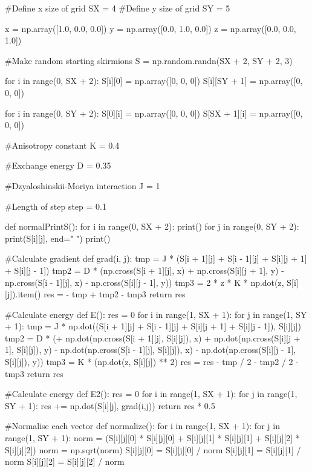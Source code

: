 \documentclass[ 12pt,x11names]{article}
\begin{document}
  \begin{python}
#Define  x size of grid
SX = 4
#Define y size of grid
SY = 5

x = np.array([1.0, 0.0, 0.0])
y = np.array([0.0, 1.0, 0.0])
z = np.array([0.0, 0.0, 1.0])

#Make random starting skirmions
S = np.random.randn(SX + 2, SY + 2, 3)

for i in range(0, SX + 2):
    S[i][0] = np.array([0, 0, 0])
    S[i][SY + 1] = np.array([0, 0, 0])

for i in range(0, SY + 2):
    S[0][i] = np.array([0, 0, 0])
    S[SX + 1][i] = np.array([0, 0, 0])

#Anisotropy constant
K = 0.4

#Exchange energy
D = 0.35

#Dzyaloshinskii-Moriya interaction
J = 1

#Length of step
step = 0.1

def normalPrintS():
    for i in range(0, SX + 2):
        print()
        for j in range(0, SY + 2):
            print(S[i][j], end=" ")
    print()

#Calculate gradient
def grad(i, j):
    tmp = J * (S[i + 1][j] + S[i - 1][j] +
               S[i][j + 1] + S[i][j - 1])
    tmp2 = D * (np.cross(S[i + 1][j], x) +
                np.cross(S[i][j + 1], y) -
                np.cross(S[i - 1][j], x) -
                np.cross(S[i][j - 1], y))
    tmp3 = 2 * z * K * np.dot(z, S[i][j]).item()
    res = - tmp + tmp2 - tmp3
    return res

#Calculate energy
def E():
    res = 0
    for i in range(1, SX + 1):
        for j in range(1, SY + 1):
            tmp = J * np.dot((S[i + 1][j] +
            S[i - 1][j] + S[i][j + 1] + S[i][j - 1]), S[i][j])
            tmp2 = D * (+ np.dot(np.cross(S[i + 1][j], S[i][j]), x)
                        + np.dot(np.cross(S[i][j + 1], S[i][j]), y)
                        - np.dot(np.cross(S[i - 1][j], S[i][j]), x)
                        - np.dot(np.cross(S[i][j - 1], S[i][j]), y))
            tmp3 = K * (np.dot(z, S[i][j]) ** 2)
            res = res - tmp / 2 - tmp2 / 2 - tmp3
    return res

#Calculate energy
def E2():
    res = 0
    for i in range(1, SX + 1):
        for j in range(1, SY + 1):
            res += np.dot(S[i][j], grad(i,j))
    return res * 0.5

#Normalise each vector
def normalize():
    for i in range(1, SX + 1):
        for j in range(1, SY + 1):
            norm = (S[i][j][0] * S[i][j][0] +
                    S[i][j][1] * S[i][j][1] +
                    S[i][j][2] * S[i][j][2])
            norm = np.sqrt(norm)
            S[i][j][0] = S[i][j][0] / norm
            S[i][j][1] = S[i][j][1] / norm
            S[i][j][2] = S[i][j][2] / norm


\end{python}
\end{document}

